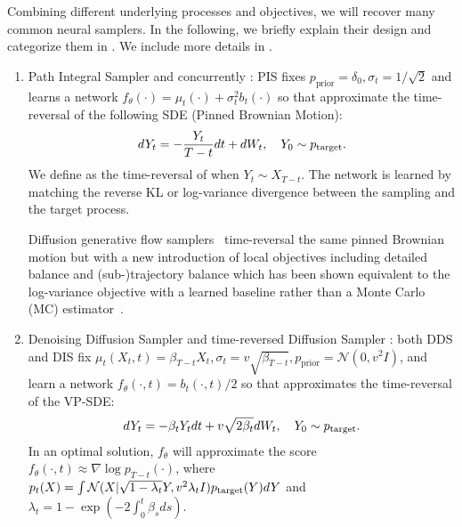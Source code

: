     
Combining different underlying processes and objectives, we will recover many common neural samplers.
In the following, we briefly explain their design and categorize them in . 
We include more details in .
    \begin{enumerate}[label=({{\arabic*}}), leftmargin=*]
        \item Path Integral Sampler \citep[PIS,][]{zhangpath} and concurrently \citep[NSFS, ][]{vargas2021bayesian}: 
        PIS fixes $p_\text{prior} = \delta_0,  \sigma_t=1/\sqrt{2}$ and learns a network $f_\theta(\cdot) =\mu_t(\cdot) + \sigma_t^2 b_t(\cdot)$ so that  approximate the time-reversal of the following SDE (Pinned Brownian Motion):
        \begin{align}\label{eq:pis_y}
             d Y_t = -\frac{Y_t}{T-t} dt + dW_t, \quad Y_0 \sim p_\text{target}.
        \end{align}
        We define  as the time-reversal of  when $Y_t \sim X_{T-t}$.
        The network is learned by matching the reverse KL \citep{zhangpath,vargas2021bayesian} or log-variance divergence \citep{richterimproved} between the sampling and the target process.
        \par
        Diffusion generative flow samplers~\citep[DFGS,][]{zhangdiffusion} time-reversal the same pinned Brownian motion but with a new introduction of local objectives including detailed balance and (sub-)trajectory balance which has been shown equivalent to the log-variance objective with a learned baseline rather than a Monte Carlo (MC) estimator~\citep{nusken2021solving}.  
        \item Denoising Diffusion Sampler \citep[DDS,][]{vargasdenoising} and time-reversed Diffusion Sampler \citep[DIS,][]{berneroptimal}: 
        both DDS and DIS fix $\mu_t(X_t, t) = \beta_{T-t} X_t, \sigma_t = v \sqrt{\beta_{T-t}}, p_\text{prior} = \mathcal{N}(0, v^2I)$, and learn a network $f_\theta(\cdot, t) = b_t(\cdot, t)/2 $ so that  approximates the time-reversal of the VP-SDE:
        \begin{align}\label{eq:dds_y}
            dY_t = -\beta_t Y_t dt + v \sqrt{2\beta_{t}} dW_t, \quad  Y_0 \sim p_\text{target}.
        \end{align}
        In an optimal solution, $f_\theta$ will approximate the score $f_\theta(\cdot, t) \approx \nabla\log p_{T-t}(\cdot)$, where $ p_{t}(X) = \int  \mathcal{N}(X|\sqrt{1-\lambda_t}Y, v^2\lambda_t I) p_\text{target}(Y)dY$ and $\lambda_t = 1-\exp(-2\int_0^t  \beta_s ds)$.

\end{enumerate}
